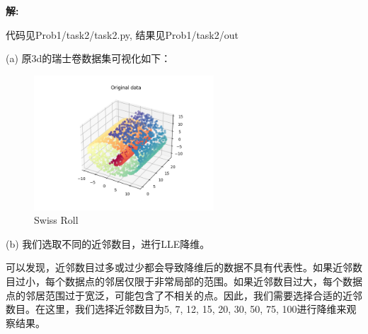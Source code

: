 \documentclass[8pt]{article}
\begin{document}
\textbf{\large 解:}

{\color{red}代码见Prob1/task2/task2.py, 结果见Prob1/task2/out}

(a) 原3d的瑞士卷数据集可视化如下：
\begin{figure}[H]
    \centering
    \includegraphics[width=0.6\textwidth]{./Prob1/task2/out/task2OriginalData.png}
    \caption{Swiss Roll}
    \label{fig:Swiss Roll}
\end{figure}

(b) 我们选取不同的近邻数目，进行LLE降维。

可以发现，近邻数目过多或过少都会导致降维后的数据不具有代表性。如果近邻数目过小，每个数据点的邻居仅限于非常局部的范围。如果近邻数目过大，每个数据点的邻居范围过于宽泛，可能包含了不相关的点。因此，我们需要选择合适的近邻数目。在这里，我们选择近邻数目为5, 7, 12, 15, 20, 30, 50, 75, 100进行降维来观察结果。
\end{document}
